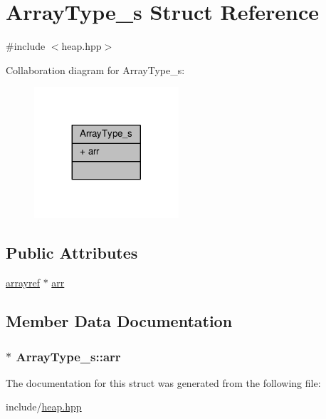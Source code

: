 \hypertarget{structArrayType__s}{\section{Array\+Type\+\_\+s Struct Reference}
\label{structArrayType__s}
}


{\ttfamily \#include $<$heap.\+hpp$>$}



Collaboration diagram for Array\+Type\+\_\+s\+:\nopagebreak
\begin{figure}[H]
\begin{center}
\leavevmode
\includegraphics[width=152pt]{structArrayType__s__coll__graph}
\end{center}
\end{figure}
\subsection*{Public Attributes}
\begin{DoxyCompactItemize}
\item 
\hyperlink{heap_8hpp_a3992092c8d3a67d7d69023ea968c8bb1}{arrayref} $\ast$ \hyperlink{structArrayType__s_a5d0ddd51febb6c6c8cda5f6d745011f1}{arr}
\end{DoxyCompactItemize}


\subsection{Member Data Documentation}
\hypertarget{structArrayType__s_a5d0ddd51febb6c6c8cda5f6d745011f1}{
\subsubsection[{arr}]{$\ast$ Array\+Type\+\_\+s\+::arr}}\label{structArrayType__s_a5d0ddd51febb6c6c8cda5f6d745011f1}


The documentation for this struct was generated from the following file\+:\begin{DoxyCompactItemize}
\item 
include/\hyperlink{heap_8hpp}{heap.\+hpp}\end{DoxyCompactItemize}
